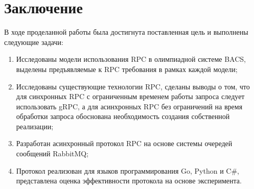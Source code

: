 \chapter{Заключение}
В ходе проделанной работы была достигнута поставленная цель и выполнены
следующие задачи:
\begin{enumerate}
    \item Исследованы модели использования RPC в олимпиадной системе BACS,
        выделены предъявляемые к RPC требования в рамках каждой модели;
    \item Исследованы существующие технологии RPC, сделаны выводы о том,
        что для синхронных RPC с ограниченным временем работы запроса
        следует использовать gRPC, а для асинхронных RPC без ограничений
        на время обработки запроса обоснована необходимость создания
        собственной реализации;
    \item Разработан асинхронный протокол RPC на основе системы очередей
        сообщений RabbitMQ;
    \item Протокол реализован для языков программирования Go, Python и C\#,
        представлена оценка эффективности протокола на основе эксперимента.
\end{enumerate}


